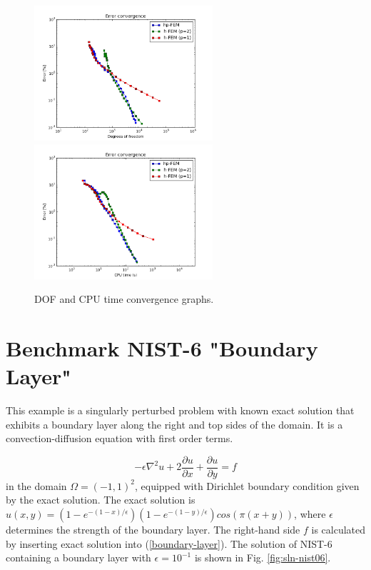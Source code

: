 \documentclass[12pt]{elsarticle}
\begin{document}
\begin{figure}[!ht]
\centering
\includegraphics[height=5cm]{nist/nist-5/conv_dof_aniso.png}\ \
\includegraphics[height=5cm]{nist/nist-5/conv_cpu_aniso.png}
\caption{DOF and CPU time convergence graphs.}
\label{fig:nist-5-conv}
\end{figure}



\section{Benchmark NIST-6 "Boundary Layer"}
\label{sec:bench-6}

This example is a singularly perturbed problem with known exact solution that exhibits
a boundary layer along the right and top sides of the domain.
It is a convection-diffusion equation with first order terms.

\begin{equation} \label{boundary-layer}
-\epsilon \nabla^{2} u + 2\frac{\partial u}{\partial x} + \frac{\partial u}{\partial y} = f
\end{equation}
in the domain $\Omega = (-1, 1)^2$, equipped with Dirichlet boundary condition
given by the exact solution. The exact solution is
$u(x,y) = (1 - e^{-(1 - x) / \epsilon})(1 - e^{-(1 - y) / \epsilon})cos(\pi (x + y))$,
where $\epsilon$ determines the strength of the boundary layer.
The right-hand side $f$ is calculated by inserting exact solution into (\ref{boundary-layer}).
The solution of NIST-6 containing a boundary layer
with $\epsilon = 10^{-1}$ is shown in Fig. \ref{fig:sln-nist06}.
\end{document}
